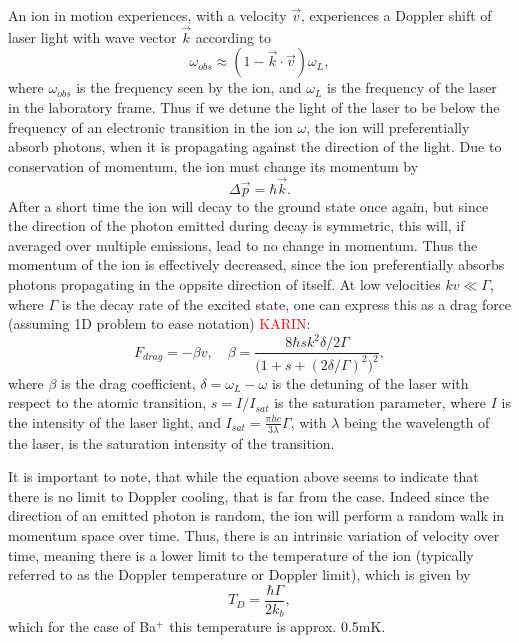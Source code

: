 An ion in motion experiences, with a velocity $\vec{v}$, experiences a Doppler shift of laser light with wave vector $\vec{k}$ according to
\begin{equation}
    \omega_{obs} \approx (1-\vec{k}\cdot\vec{v})\omega_L,
\end{equation}
where $\omega_{obs}$ is the frequency seen by the ion, and $\omega_L$ is the frequency of the laser in the laboratory frame.
Thus if we detune the light of the laser to be below the frequency of an electronic transition in the ion $\omega$, the ion will preferentially absorb photons, when it is propagating against the direction of the light.
Due to conservation of momentum, the ion must change its momentum by
\begin{equation}
    \Delta\vec{p} = \hbar\vec{k}.
\end{equation}
After a short time the ion will decay to the ground state once again, but since the direction of the photon emitted during decay is symmetric, this will, if averaged over multiple emissions, lead to no change in momentum.
Thus the momentum of the ion is effectively decreased, since the ion preferentially absorbs photons propagating in the oppsite direction of itself. At low velocities $kv\ll\Gamma$, where $\Gamma$ is the decay rate of the excited state, one can express this as a drag force (assuming 1D problem to ease notation) \textcolor{red}{KARIN}:
\begin{equation}
    F_{drag} = -\beta v,\quad \beta = \frac{8\hbar s k^2\delta / 2\Gamma}{\big(1+s+(2\delta/\Gamma)^2\big)^2},
\end{equation}
where $\beta$ is the drag coefficient, $\delta = \omega_L-\omega$ is the detuning of the laser with respect to the atomic transition, $s = I/I_{sat}$ is the saturation parameter, where $I$ is the intensity of the laser light, and $I_{sat} = \frac{\pi hc}{3\lambda}\Gamma$, with $\lambda$ being the wavelength of the laser, is the saturation intensity of the transition. 

It is important to note, that while the equation above seems to indicate that there is no limit to Doppler cooling, that is far from the case. Indeed since the direction of an emitted photon is random, the ion will perform a random walk in momentum space over time.
Thus, there is an intrinsic variation of velocity over time, meaning there is a lower limit to the temperature of the ion (typically referred to as the Doppler temperature or Doppler limit), which is given by
\begin{equation}
    T_D = \frac{\hbar\Gamma}{2k_b},
\end{equation}
which for the case of Ba$^+$ this temperature is approx. 0.5mK.

